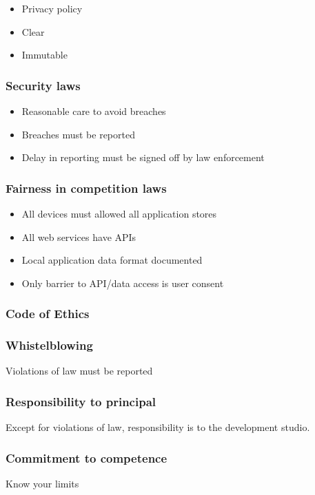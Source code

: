 \begin{itemize}
\item Privacy policy
\item Clear
\item Immutable
\end{itemize}


\begin{frame}[fragile]
\frametitle{Security laws}


\end{frame}

\begin{itemize}
\item Reasonable care to avoid breaches
\item Breaches must be reported
\item Delay in reporting must be signed off by law enforcement
\end{itemize}

\begin{frame}[fragile]
\frametitle{Fairness in competition laws}

\end{frame}

\begin{itemize}
\item All devices must allowed all application stores
\item All web services have APIs
\item Local application data format documented
\item Only barrier to API/data access is user consent
\end{itemize}

\begin{frame}[fragile]
\frametitle{Code of Ethics}

\end{frame}


\begin{frame}[fragile]
\frametitle{Whistelblowing}

Violations of law must be reported

\end{frame}

\begin{frame}[fragile]
\frametitle{Responsibility to principal}

Except for violations of law,
responsibility is to the development studio.

\end{frame}

\begin{frame}[fragile]
\frametitle{Commitment to competence}

Know your limits

\end{frame}

